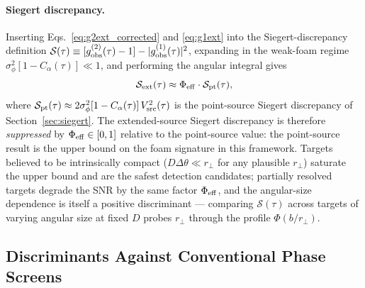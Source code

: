 \documentclass[aps,prd,onecolumn,amsmath,amssymb]{revtex4-2}
\begin{document}
\paragraph{Siegert discrepancy.}
Inserting Eqs.~\eqref{eq:g2ext_corrected} and \eqref{eq:g1ext} into the
Siegert-discrepancy definition $\mathcal{S}(\tau) \equiv [g^{(2)}_{\rm obs}(\tau)-1]
- |g^{(1)}_{\rm obs}(\tau)|^2$, expanding in the weak-foam regime
$\sigma_\phi^2[1-C_\alpha(\tau)] \ll 1$, and performing the angular
integral gives
\begin{equation}
  \mathcal{S}_{\rm ext}(\tau)
  \approx \Phi_{\rm eff}\cdot\mathcal{S}_{\rm pt}(\tau),
  \label{eq:SiegertExt}
\end{equation}
where $\mathcal{S}_{\rm pt}(\tau) \approx 2\sigma_\phi^2[1-C_\alpha(\tau)]\,
V_{\rm src}^2(\tau)$ is the point-source Siegert discrepancy of
Section~\ref{sec:siegert}.  The extended-source Siegert discrepancy is
therefore \emph{suppressed} by $\Phi_{\rm eff}\in[0,1]$ relative to the
point-source value: the point-source result is the upper bound on the
foam signature in this framework.  Targets believed to be intrinsically
compact ($D\Delta\theta \ll r_\perp$ for any plausible $r_\perp$) saturate
the upper bound and are the safest detection candidates; partially
resolved targets degrade the SNR by the same factor $\Phi_{\rm eff}$,
and the angular-size dependence is itself a positive discriminant ---
comparing $\mathcal{S}(\tau)$ across targets of varying angular size at
fixed $D$ probes $r_\perp$ through the profile $\Phi(b/r_\perp)$.

\subsection{Discriminants Against Conventional Phase Screens}
\end{document}
